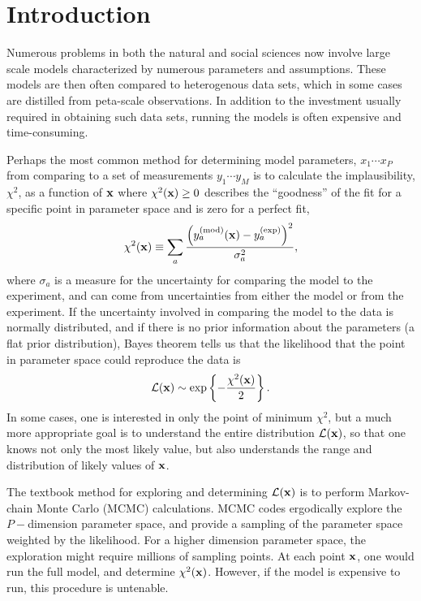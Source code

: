 \section{Introduction}\label{sec:intro}

Numerous problems in both the natural and social sciences now involve large scale models characterized by numerous parameters and assumptions. These models are then often compared to heterogenous data sets, which in some cases are distilled from peta-scale observations. In addition to the investment usually required in obtaining such data sets, running the models is often expensive and time-consuming. 

Perhaps the most common method for determining model parameters, $x_1\cdots x_P$ from comparing to a set of measurements $y_1\cdots y_M$ is to calculate the implausibility, $\chi^2$, as a function of ${\bf x}$ where $\chi^2({\bf x})\ge 0$ describes the ``goodness'' of the fit for a specific point in parameter space and is zero for a perfect fit,
\begin{equation}
\chi^2({\bf x})\equiv
\sum_a \frac{\left(y_a^{\rm(mod)}({\bf x})-y_a^{\rm(exp)}\right)^2}{\sigma_a^2},
\end{equation}
where $\sigma_a$ is a measure for the uncertainty for comparing the model to the experiment, and can come from uncertainties from either the model or from the experiment. If the uncertainty involved in comparing the model to the data is normally distributed, and if there is no prior information about the parameters (a flat prior distribution), Bayes theorem tells us that the likelihood that the point in parameter space could reproduce the data is
\begin{equation}
\mathcal{L}({\bf x})\sim \exp\left\{-\frac{\chi^2({\bf x})}{2}\right\}.
\end{equation}
In some cases, one is interested in only the point of minimum $\chi^2$, but a much more appropriate goal is to understand the entire distribution $\mathcal{L}({\bf x})$, so that one knows not only the most likely value, but also understands the range and distribution of likely values of ${\bf x}$. 

The textbook method for exploring and determining $\mathcal{L}({\bf x})$ is to perform Markov-chain Monte Carlo (MCMC) calculations. MCMC codes ergodically explore the $P-$dimension parameter space, and provide a sampling of the parameter space weighted by the likelihood. For a higher dimension parameter space, the exploration might require millions of sampling points. At each point ${\bf x}$, one would run the full model, and determine $\chi^2({\bf x})$. However, if the model is expensive to run, this procedure is untenable.

